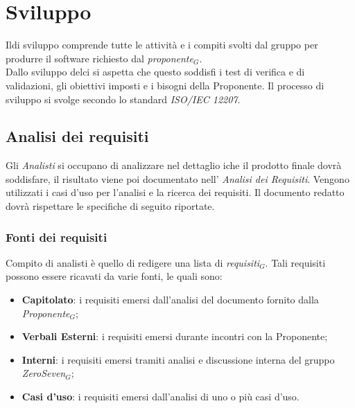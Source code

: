 
\section{Sviluppo}
Ildi sviluppo comprende tutte le attività e i compiti svolti dal gruppo per produrre il software richiesto dal \textit{proponente$_{G}$}.\\ Dallo sviluppo delci si aspetta che questo soddisfi i test di verifica e di validazioni, gli obiettivi imposti e i bisogni della Proponente. Il processo di sviluppo si svolge secondo lo standard \textit{ISO/IEC 12207}.
\subsection{Analisi dei requisiti}
Gli \textit{Analisti} si occupano di analizzare nel dettaglio iche il prodotto finale dovrà soddisfare, il risultato viene poi documentato nell' \textit{Analisi dei Requisiti}. Vengono utilizzati i casi d'uso per l'analisi e la ricerca dei requisiti.
Il documento redatto dovrà rispettare le specifiche di seguito riportate.
\subsubsection{Fonti dei requisiti}
Compito di analisti è quello di redigere una lista di \textit{requisiti$_{G}$}. Tali requisiti possono essere ricavati da varie fonti, le quali sono:
\begin{itemize}
	\item \textbf{Capitolato}: i requisiti emersi dall'analisi del documento fornito dalla \textit{Proponente$_{G}$};
	\item \textbf{Verbali Esterni}: i requisiti emersi durante incontri con la Proponente;
	\item \textbf{Interni}: i requisiti emersi tramiti analisi e discussione interna del gruppo \textit{ZeroSeven$_{G}$};
	\item \textbf{Casi d'uso}: i requisiti emersi dall'analisi di uno o più casi d'uso.
\end{itemize}
